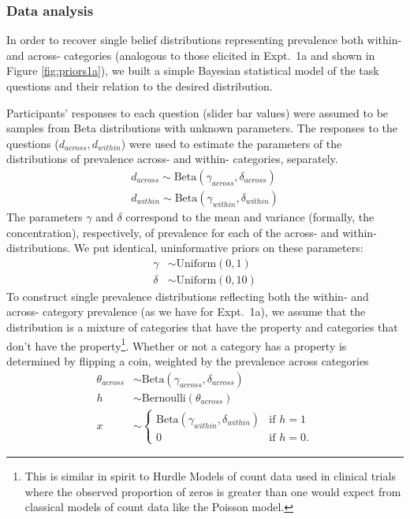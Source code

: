 \documentclass[10pt,letterpaper]{article}
\begin{document}
\subsubsection{Data analysis}

In order to recover single belief distributions representing prevalence both within- and across- categories (analogous to those elicited in Expt.~1a and shown in Figure \ref{fig:priors1a}), we built a simple Bayesian statistical model of the task questions and their relation to the desired distribution. 

Participants' responses to each question (slider bar values) were assumed to be samples from Beta distributions with unknown parameters. 
The responses to the questions ($d_{across}, d_{within}$) were used to estimate the parameters of the distributions of prevalence across- and within- categories, separately. 
\begin{align*}
d_{across} \sim \text{Beta}(\gamma_{across}, \delta_{across}) \\
d_{within} \sim \text{Beta}(\gamma_{within}, \delta_{within}) 
\end{align*}
The parameters $\gamma$ and $\delta$ correspond to the mean and variance (formally, the concentration), respectively, of prevalence for each of the across- and within- distributions. 
We put identical, uninformative priors on these parameters:
\begin{align*}
\gamma & \sim \text{Uniform}(0,1) \\
\delta & \sim \text{Uniform}(0,10)
\end{align*}
To construct single prevalence distributions reflecting both the within- and across- category prevalence (as we have for Expt.~1a), we assume that the distribution is a mixture of categories that have the property and categories that don't have the property\footnote{This is similar in spirit to Hurdle Models of count data used in clinical trials where the observed proportion of zeros is greater than one would expect from classical models of count data like the Poisson model.}. Whether or not a category has a property is determined by flipping a coin, weighted by the prevalence across categories
\begin{align*}
\theta_{across} & \sim \text{Beta}(\gamma_{across}, \delta_{across}) \\ 
h & \sim \text{Bernoulli}(\theta_{across}) \\
x & \sim \begin{cases} 
		\text{Beta}(\gamma_{within}, \delta_{within}) &\mbox{if } h = 1 \\ 
				0 & \mbox{if } h=0. 
				\end{cases} 
\end{align*}
\end{document}
